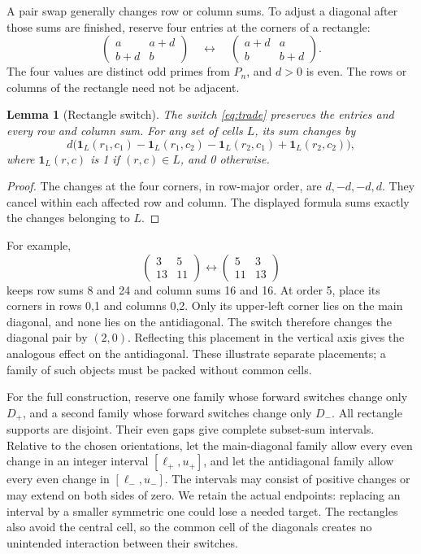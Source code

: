 \documentclass[11pt]{article}
\newtheorem{lemma}[theorem]{Lemma}
\theoremstyle{definition}
\begin{document}
A pair swap generally changes row or column sums. To adjust a diagonal after
those sums are finished, reserve four entries at the corners of a rectangle:
\begin{equation}\label{eq:trade}
 \begin{pmatrix}a&a+d\\b+d&b\end{pmatrix}
 \quad\longleftrightarrow\quad
 \begin{pmatrix}a+d&a\\b&b+d\end{pmatrix}.
\end{equation}
The four values are distinct odd primes from \(P_n\), and \(d>0\) is even.
The rows or columns of the rectangle need not be adjacent.

\begin{lemma}[Rectangle switch]\label{lem:rectangle}
The switch \eqref{eq:trade} preserves the entries and every row and column sum.
For any set of cells \(L\), its sum changes by
\[
 d\bigl(\mathbf1_L(r_1,c_1)-\mathbf1_L(r_1,c_2)
       -\mathbf1_L(r_2,c_1)+\mathbf1_L(r_2,c_2)\bigr),
\]
where \(\mathbf1_L(r,c)\) is 1 if \((r,c)\in L\), and 0 otherwise.
\end{lemma}
\begin{proof}
The changes at the four corners, in row-major order, are \(d,-d,-d,d\).
They cancel within each affected row and column. The displayed formula sums
exactly the changes belonging to \(L\).
\end{proof}

For example,
\[
 \begin{pmatrix}3&5\\13&11\end{pmatrix}
 \longleftrightarrow
 \begin{pmatrix}5&3\\11&13\end{pmatrix}
\]
keeps row sums 8 and 24 and column sums 16 and 16. At order 5, place its
corners in rows 0,1 and columns 0,2. Only its upper-left corner lies on the
main diagonal, and none lies on the antidiagonal. The switch therefore
changes the diagonal pair by \((2,0)\). Reflecting this placement in the
vertical axis gives the analogous effect on the antidiagonal. These illustrate
separate placements; a family of such objects must be packed without common cells.

For the full construction, reserve one family whose forward switches change
only \(D_+\), and a second family whose forward switches change only \(D_-\).
All rectangle supports are disjoint. Their even gaps give complete subset-sum
intervals. Relative to the chosen orientations, let the main-diagonal family
allow every even change in an integer interval \([\ell_+,u_+]\), and let the
antidiagonal family allow every even change in \([\ell_-,u_-]\). The intervals
may consist of positive changes or may extend on both sides of zero. We retain
the actual endpoints: replacing an interval by a smaller symmetric one could
lose a needed target. The rectangles also avoid the central cell, so the common
cell of the diagonals creates no unintended interaction between their switches.
\end{document}
